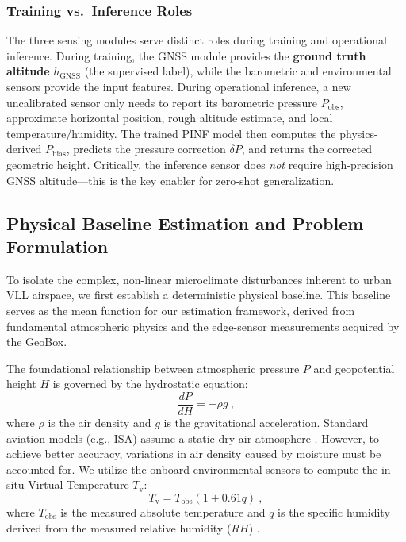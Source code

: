 \subsubsection{Training vs.\ Inference Roles}
The three sensing modules serve distinct roles during training and operational inference. During training, the GNSS module provides the \textbf{ground truth altitude} $h_\text{GNSS}$ (the supervised label), while the barometric and environmental sensors provide the input features. During operational inference, a new uncalibrated sensor only needs to report its barometric pressure $P_\text{obs}$, approximate horizontal position, rough altitude estimate, and local temperature/humidity. The trained PINF model then computes the physics-derived $P_{\text{bias}}$, predicts the pressure correction $\delta P$, and returns the corrected geometric height. Critically, the inference sensor does \emph{not} require high-precision GNSS altitude---this is the key enabler for zero-shot generalization.



\subsection{Physical Baseline Estimation and Problem Formulation}
\label{subsec:physical_baseline}
To isolate the complex, non-linear microclimate disturbances inherent to urban VLL airspace, we first establish a deterministic physical baseline. This baseline serves as the mean function for our estimation framework, derived from fundamental atmospheric physics and the edge-sensor measurements acquired by the GeoBox.

The foundational relationship between atmospheric pressure $P$ and geopotential height $H$ is governed by the hydrostatic equation:
\begin{equation}
\frac{dP}{dH} = -\rho g \ ,
\label{eq:hydrostatic}
\end{equation}
where $\rho$ is the air density and $g$ is the gravitational acceleration. Standard aviation models (e.g., ISA) assume a static dry-air atmosphere \cite{icao1993manual}. However, to achieve better accuracy, variations in air density caused by moisture must be accounted for. We utilize the onboard environmental sensors to compute the in-situ Virtual Temperature $T_\text{v}$:
\begin{equation}
T_\text{v} = T_\text{obs} (1 + 0.61 q) \ ,
\label{eq:virtual_temp}
\end{equation}
where $T_\text{obs}$ is the measured absolute temperature and $q$ is the specific humidity derived from the measured relative humidity ($RH$) \cite{simonetti2024geodetic}. 

